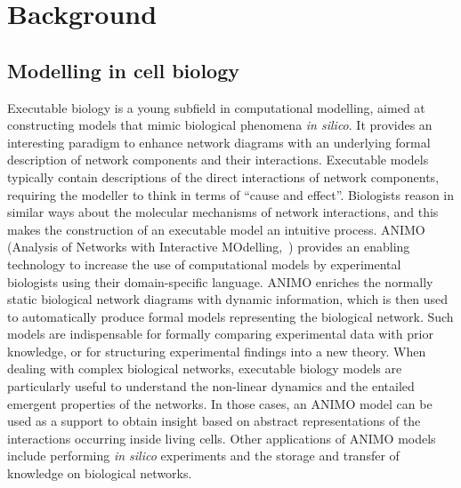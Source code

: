 \documentclass{bmcart}
\begin{document}
\section*{Background}\label{sec:introduction}
\subsection*{Modelling in cell biology}
Executable biology is a young subfield in computational modelling, aimed at constructing models that mimic
biological phenomena \emph{in silico}. It provides an interesting paradigm 
to enhance network diagrams with an underlying formal description of network components
and their interactions. Executable models typically contain descriptions of the 
direct interactions of network components, requiring the modeller to think in terms of
``cause and effect''. Biologists reason in similar ways about the molecular mechanisms of network
interactions, and this makes the construction of an executable model an intuitive process.
ANIMO (Analysis of Networks with Interactive MOdelling,~\cite{animo-ieee,animo-gene})
provides an enabling technology to increase the use of computational models by experimental
biologists using their domain-specific language. 
ANIMO enriches the normally static biological network diagrams with dynamic information,
which is then used to automatically produce formal models representing the biological network.
Such models are indispensable for formally
comparing experimental data with prior knowledge, or for structuring experimental findings into a
new theory.
When dealing with complex biological networks, executable biology models are particularly useful
to understand the non-linear dynamics and the entailed emergent properties of the networks.
In those cases, an ANIMO model can be used as a support to obtain insight based on abstract
representations of the interactions occurring inside living cells.
Other applications of ANIMO models include performing \emph{in silico} experiments and
the storage and transfer of knowledge on biological networks.
\end{document}
